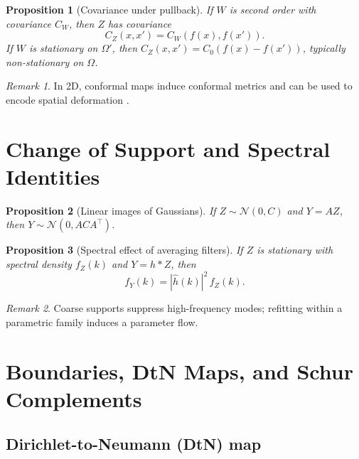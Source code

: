 \documentclass[11pt]{article}
\theoremstyle{definition}
\theoremstyle{plain}
\newtheorem{proposition}{Proposition}[section]
\theoremstyle{remark}
\newtheorem{remark}{Remark}[section]
\begin{document}
\begin{proposition}[Covariance under pullback]\label{prop:pullcov}
If $W$ is second order with covariance $C_W$, then $Z$ has covariance
\[
C_Z(x,x')=C_W(f(x),f(x')).
\]
If $W$ is stationary on $\Omega'$, then $C_Z(x,x')=C_0(f(x)-f(x'))$, typically non-stationary on $\Omega$.
\end{proposition}

\begin{remark}
In 2D, conformal maps induce conformal metrics and can be used to encode spatial deformation \citep{SampsonGuttorp1992,ChilesDelfiner2012}.
\end{remark}

\section{Change of Support and Spectral Identities}\label{sec:cos}

\begin{proposition}[Linear images of Gaussians]\label{prop:linimage}
If $Z\sim\mathcal{N}(0,C)$ and $Y=AZ$, then $Y\sim\mathcal{N}(0,ACA^\top)$.
\end{proposition}

\begin{proposition}[Spectral effect of averaging filters]\label{prop:filter}
If $Z$ is stationary with spectral density $f_Z(k)$ and $Y=h*Z$, then
\[
f_Y(k)=|\widehat{h}(k)|^2\,f_Z(k).
\]
\end{proposition}

\begin{remark}
Coarse supports suppress high-frequency modes; refitting within a parametric family induces a parameter flow.
\end{remark}

\section{Boundaries, DtN Maps, and Schur Complements}\label{sec:boundary}

\subsection{Dirichlet-to-Neumann (DtN) map}
\end{document}
